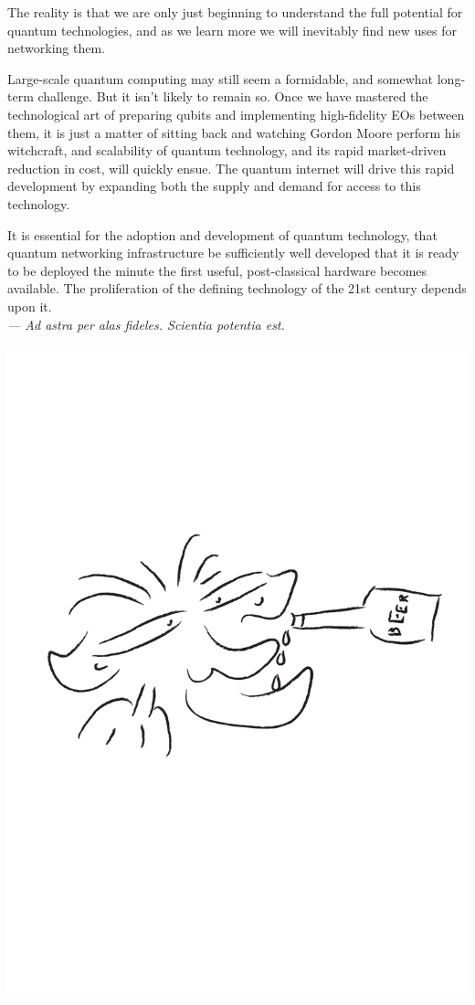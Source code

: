 \documentclass[aps, rmp, twocolumn, amsmath, amssymb, nofootinbib, superscriptaddress, longbibliography, floatfix, table-of-contents, eqsecnum]{revtex4-1}
\begin{document}
The reality is that we are only just beginning to understand the full potential for quantum technologies, and as we learn more we will inevitably find new uses for networking them.

Large-scale quantum computing may still seem a formidable, and somewhat long-term challenge. But it isn't likely to remain so. Once we have mastered the technological art of preparing qubits and implementing high-fidelity EOs between them, it is just a matter of sitting back and watching Gordon Moore perform his witchcraft, and scalability of quantum technology, and its rapid market-driven reduction in cost, will quickly ensue. The quantum internet will drive this rapid development by expanding both the supply and demand for access to this technology.

It is essential for the adoption and development of quantum technology, that quantum networking infrastructure be sufficiently well developed that it is ready to be deployed the minute the first useful, post-classical hardware becomes available. The proliferation of the defining technology of the 21st century depends upon it.
\\

\textit{--- Ad astra per alas fideles. Scientia potentia est.}

\begin{center}
	\includegraphics[width=0.6\columnwidth]{sketch_34}
\end{center}
\end{document}
